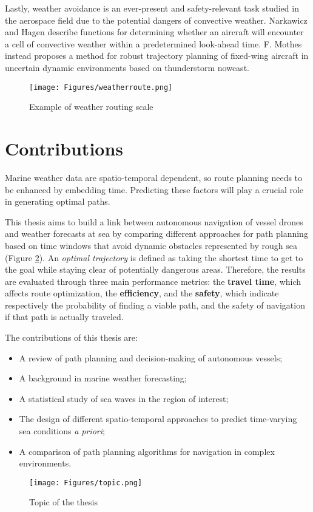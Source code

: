 Lastly, weather avoidance is an ever-present and safety-relevant task studied in the aerospace field due to the potential dangers of convective weather. Narkawicz and Hagen \cite{narkawicz2016algorithms} describe functions for determining whether an aircraft will encounter a cell of convective weather within a predetermined look-ahead time. F. Mothes \cite{mothes2019trajectory} instead proposes a method for robust trajectory planning of fixed-wing aircraft in uncertain dynamic environments based on thunderstorm nowcast. 
\begin{figure}[H]
	\centering
	\texttt{[image: Figures/weatherroute.png]}
	\caption{Example of weather routing scale}
	\label{weatherroute}
\end{figure}
\section{Contributions}
Marine weather data are spatio-temporal dependent, so route planning needs to be enhanced by embedding time. Predicting these factors will play a crucial role in generating optimal paths.

This thesis aims to build a link between autonomous navigation of vessel drones and weather forecasts at sea by comparing different approaches for path planning based on time windows that avoid dynamic obstacles represented by rough sea (Figure \ref{topic}). An \textit{optimal trajectory} is defined as taking the shortest time to get to the goal while staying clear of potentially dangerous areas. Therefore, the results are evaluated through three main performance metrics: the \textbf{travel time}, which affects route optimization, the \textbf{efficiency}, and the \textbf{safety}, which indicate respectively the probability of finding a viable path, and the safety of navigation if that path is actually traveled.

The contributions of this thesis are:
\begin{itemize}[itemsep=0pt]
	\item A review of path planning and decision-making of autonomous vessels;
	\item A background in marine weather forecasting;
	\item A statistical study of sea waves in the region of interest;
	\item The design of different spatio-temporal approaches to predict time-varying sea conditions \textit{a priori};
	\item A comparison of path planning algorithms for navigation in complex environments.
\end{itemize} 
\begin{figure}[h]
	\centering
	\texttt{[image: Figures/topic.png]}
	\caption{Topic of the thesis}
	\label{topic}
\end{figure}



